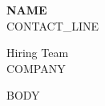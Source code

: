 \documentclass[11pt]{article}
\begin{document}
\begin{flushleft}
{\large \bfseries {{NAME}}}\\[2pt]
{{CONTACT_LINE}}
\end{flushleft}

\vspace{12pt}

\vspace{12pt}
\noindent Hiring Team\\
{{COMPANY}}

\vspace{12pt}

{{BODY}}
\end{document}
